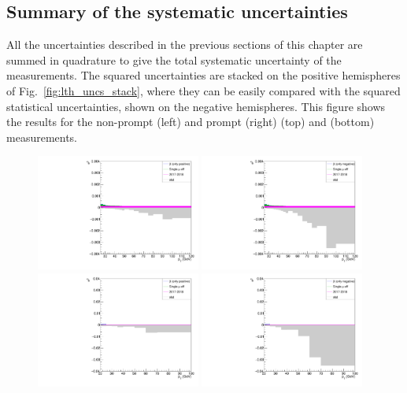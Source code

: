 \vfill\newpage

\subsection{Summary of the systematic uncertainties}

All the uncertainties described in the previous sections of this chapter
are summed in quadrature to give the total 
systematic uncertainty of the measurements.
The squared uncertainties are stacked on the positive hemispheres 
of Fig.~\ref{fig:lth_uncs_stack},
where they can be easily compared with the squared statistical uncertainties,
shown on the negative hemispheres.
This figure shows the results for the non-prompt (left) and prompt (right)
\jpsi (top) and \psip (bottom) measurements.

\begin{figure}[h]
\centering
\includegraphics[width=0.48\textwidth]{Figures/chapter6/lthNP_uncs_stack-jpsi.pdf}
\includegraphics[width=0.48\textwidth]{Figures/chapter6/lthPR_uncs_stack-jpsi.pdf}\\
\includegraphics[width=0.48\textwidth]{Figures/chapter6/lthNP_uncs_stack-psip.pdf}
\includegraphics[width=0.48\textwidth]{Figures/chapter6/lthPR_uncs_stack-psip.pdf}

\end{figure}
